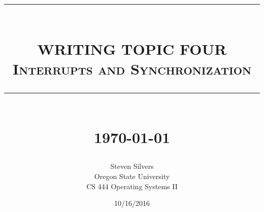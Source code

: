 \documentclass[10pt,serif,draftclsnofoot,onecolumn]{IEEEtran}
\newcommand{\HRule}[1]{\rule{\linewidth}{#1}}
\begin{document}
	\begin{titlepage}


	\title{ \normalsize \textsc{}
			\\ [2.0cm]
			\HRule{0.5pt} \\
			\LARGE \textbf{\uppercase{Writing topic four}}
			\\ \normalsize \textsc{Interrupts and Synchronization}
			\HRule{2pt} \\ [0.5cm]
			\normalsize \today \vspace*{5\baselineskip}}
	\date{10/16/2016}
	
	\author{Steven Silvers \\
			Oregon State University \\
			CS 444 Operating Systems II}
	\maketitle
	\end{titlepage}
	\newpage
\end{document}

